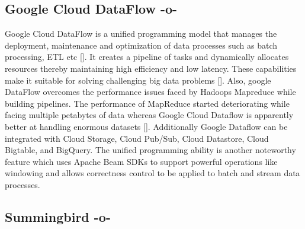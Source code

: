 \subsection{Google Cloud DataFlow -o-}
     
Google Cloud DataFlow is a unified programming model that manages the
deployment, maintenance and optimization of data processes such as
batch processing, ETL etc [\cite{www-cloud-google1}]. It creates a
pipeline of tasks and dynamically allocates resources thereby
maintaining high efficiency and low latency. These capabilities make
it suitable for solving challenging big data problems
[\cite{www-cloud-google1}]. Also, google DataFlow overcomes the
performance issues faced by Hadoops Mapreduce while building
pipelines\cite{www-dataconomy}.  The performance of MapReduce started
deteriorating while facing multiple petabytes of data whereas Google
Cloud Dataflow is apparently better at handling enormous datasets
[\cite{www-cloud-google1}]. Additionally Google Dataflow can be
integrated with Cloud Storage, Cloud Pub/Sub, Cloud Datastore, Cloud
Bigtable, and BigQuery. The unified programming ability is another
noteworthy feature which uses Apache Beam SDKs to support powerful
operations like windowing and allows correctness control to be applied
to batch and stream data processes.



     
\subsection{Summingbird -o-}
     

